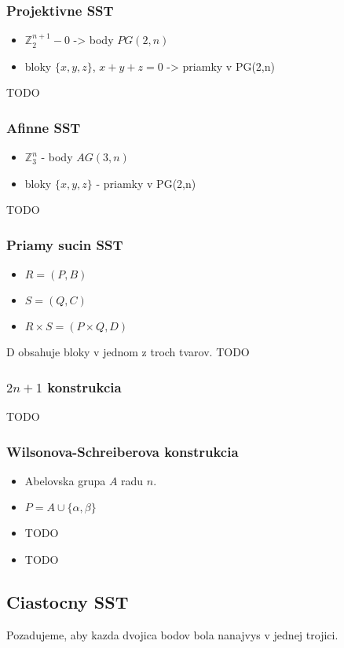 \documentclass[10pt,a4paper]{article}
\begin{document}
\subsubsection{Projektivne SST}
\begin{itemize}
\item $\mathbb{Z}_2^{n+1} - {0}$ -> body $PG(2,n)$
\item bloky $\{x,y,z\}$, $x+y+z = 0$ -> priamky v PG(2,n)
\end{itemize}
TODO

\subsubsection{Afinne SST}
\begin{itemize}
\item $\mathbb{Z}_3^{n}$ - body $AG(3,n)$
\item bloky $\{x,y,z\}$ - priamky v PG(2,n)
\end{itemize}
TODO


\subsubsection{Priamy sucin SST}
\begin{itemize}
\item $R=(P,B)$
\item $S=(Q,C)$
\item $R \times S = (P \times Q, D)$
\end{itemize}

D obsahuje bloky v jednom z troch tvarov.
TODO

\subsubsection{$2n+1$ konstrukcia}
TODO

\subsubsection{Wilsonova-Schreiberova konstrukcia}
\begin{itemize}
\item Abelovska grupa $A$ radu $n$.
\item $P=A \cup \{\alpha, \beta\}$
\item TODO
\item TODO
\end{itemize}

\subsection{Ciastocny SST}
Pozadujeme, aby kazda dvojica bodov bola nanajvys v jednej trojici. 
\end{document}

